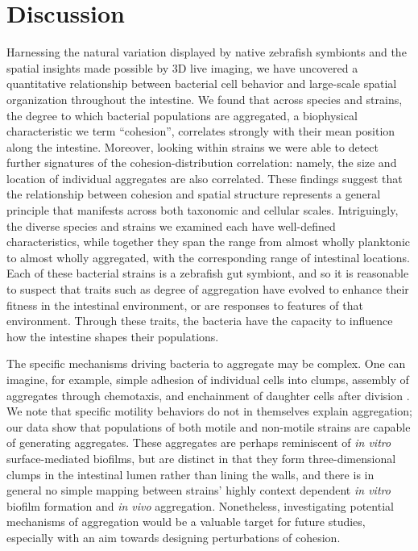 \section*{Discussion}	

Harnessing the natural variation displayed by native zebrafish symbionts and the spatial insights made possible by 3D live imaging, we have uncovered a quantitative relationship between bacterial cell behavior and large-scale spatial organization throughout the intestine. We found that across species and strains, the degree to which bacterial populations are aggregated, a biophysical characteristic we term ``cohesion'', correlates strongly with their mean position along the intestine. Moreover, looking within strains we were able to detect further signatures of the cohesion-distribution correlation: namely, the size and location of individual aggregates are also correlated. These findings suggest that the relationship between cohesion and spatial structure represents a general principle that manifests across both taxonomic and cellular scales. Intriguingly, the diverse species and strains we examined each have well-defined characteristics, while together they span the range from almost wholly planktonic to almost wholly aggregated, with the corresponding range of intestinal locations. Each of these bacterial strains is a zebrafish gut symbiont, and so it is reasonable to suspect that traits such as degree of aggregation have evolved to enhance their fitness in the intestinal environment, or are responses to features of that environment. Through these traits, the bacteria have the capacity to influence how the intestine shapes their populations.

The specific mechanisms driving bacteria to aggregate may be complex. One can imagine, for example, simple adhesion of individual cells into clumps, assembly of aggregates through chemotaxis, and enchainment of daughter cells after division \mbox{\cite{Moor2017}}. We note that specific motility behaviors do not in themselves explain aggregation; our data show that populations of both motile and non-motile strains \mbox{\cite{Wiles2018}} are capable of generating aggregates. These aggregates are perhaps reminiscent of \textit{in vitro} surface-mediated biofilms, but are distinct in that they form three-dimensional clumps in the intestinal lumen rather than lining the walls, and there is in general no simple mapping between strains' highly context dependent \textit{in vitro} biofilm formation and \textit{in vivo} aggregation. Nonetheless, investigating potential mechanisms of aggregation would be a valuable target for future studies, especially with an aim towards designing perturbations of cohesion.

